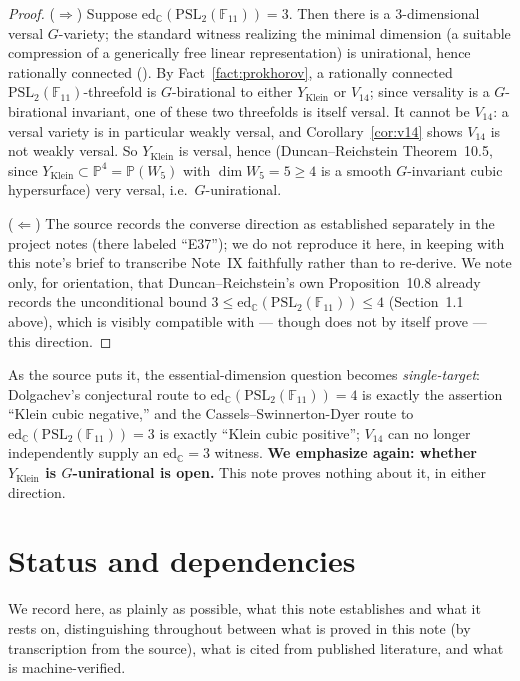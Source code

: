 \documentclass[11pt]{article}
\theoremstyle{plain}
\theoremstyle{definition}
\theoremstyle{remark}
\newcommand{\PSL}{\mathrm{PSL}_2(\mathbb{F}_{11})}
\newcommand{\edC}{\mathrm{ed}_{\mathbb C}}
\newcommand{\PP}{\mathbb P}
\begin{document}
\begin{proof}
($\Rightarrow$) Suppose $\edC(\PSL)=3$. Then there is a $3$-dimensional
versal $G$-variety; the standard witness realizing the minimal
dimension (a suitable compression of a generically free linear
representation) is unirational, hence rationally connected
(\cite[Remark~2.6]{DR}). By Fact~\ref{fact:prokhorov}, a rationally
connected $\PSL$-threefold is $G$-birational to either $Y_{\mathrm
{Klein}}$ or $V_{14}$; since versality is a $G$-birational invariant,
one of these two threefolds is itself versal. It cannot be $V_{14}$: a
versal variety is in particular weakly versal, and Corollary~\ref{cor:v14}
shows $V_{14}$ is not weakly versal. So $Y_{\mathrm{Klein}}$ is versal,
hence (Duncan--Reichstein Theorem~10.5, since $Y_{\mathrm{Klein}}
\subset\PP^4=\PP(W_5)$ with $\dim W_5=5\ge 4$ is a smooth $G$-invariant
cubic hypersurface) very versal, i.e.\ $G$-unirational.

($\Leftarrow$) The source records the converse direction as established
separately in the project notes (there labeled ``E37''); we do not
reproduce it here, in keeping with this note's brief to transcribe
Note~IX faithfully rather than to re-derive. We note only, for
orientation, that Duncan--Reichstein's own Proposition~10.8 already
records the unconditional bound $3\le\edC(\PSL)\le 4$ (Section~1.1
above), which is visibly compatible with --- though does not by itself
prove --- this direction.
\end{proof}

As the source puts it, the essential-dimension question becomes
\emph{single-target}: Dolgachev's conjectural route to $\edC(\PSL)=4$
is exactly the assertion ``Klein cubic negative,'' and the
Cassels--Swinnerton-Dyer route to $\edC(\PSL)=3$ is exactly ``Klein
cubic positive''; $V_{14}$ can no longer independently supply an
$\edC=3$ witness. \textbf{We emphasize again: whether $Y_{\mathrm
{Klein}}$ is $G$-unirational is open.} This note proves nothing about
it, in either direction.

\section{Status and dependencies}
\label{sec:status}

We record here, as plainly as possible, what this note establishes and
what it rests on, distinguishing throughout between what is proved in
this note (by transcription from the source), what is cited from
published literature, and what is machine-verified.
\end{document}
